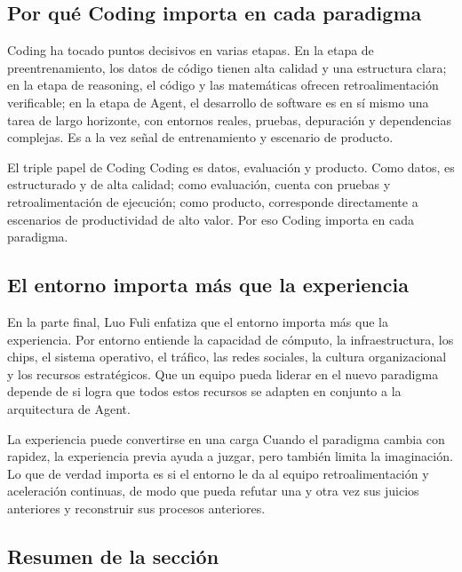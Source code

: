 \documentclass[a4paper]{article}
\begin{document}
\subsection{Por qué Coding importa en cada paradigma}

Coding ha tocado puntos decisivos en varias etapas. En la etapa de preentrenamiento, los datos de código tienen alta calidad y una estructura clara; en la etapa de reasoning, el código y las matemáticas ofrecen retroalimentación verificable; en la etapa de Agent, el desarrollo de software es en sí mismo una tarea de largo horizonte, con entornos reales, pruebas, depuración y dependencias complejas. Es a la vez señal de entrenamiento y escenario de producto.

\begin{importantbox}{El triple papel de Coding}
Coding es datos, evaluación y producto. Como datos, es estructurado y de alta calidad; como evaluación, cuenta con pruebas y retroalimentación de ejecución; como producto, corresponde directamente a escenarios de productividad de alto valor. Por eso Coding importa en cada paradigma.
\end{importantbox}

\subsection{El entorno importa más que la experiencia}

En la parte final, Luo Fuli enfatiza que el entorno importa más que la experiencia. Por entorno entiende la capacidad de cómputo, la infraestructura, los chips, el sistema operativo, el tráfico, las redes sociales, la cultura organizacional y los recursos estratégicos. Que un equipo pueda liderar en el nuevo paradigma depende de si logra que todos estos recursos se adapten en conjunto a la arquitectura de Agent.

\begin{warningbox}{La experiencia puede convertirse en una carga}
Cuando el paradigma cambia con rapidez, la experiencia previa ayuda a juzgar, pero también limita la imaginación. Lo que de verdad importa es si el entorno le da al equipo retroalimentación y aceleración continuas, de modo que pueda refutar una y otra vez sus juicios anteriores y reconstruir sus procesos anteriores.
\end{warningbox}

\subsection{Resumen de la sección}
\end{document}
